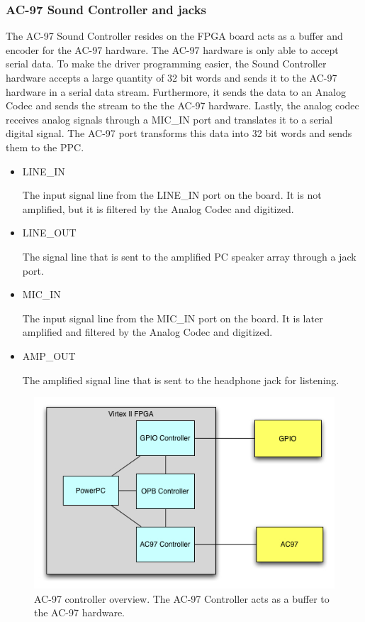 \documentclass[11pt,letter,oneside]{report}
\begin{document}
	\subsubsection{AC-97 Sound Controller and jacks}
		The AC-97 Sound Controller resides on the FPGA board acts as a buffer and encoder for the AC-97 hardware. The AC-97 hardware is only able to accept serial data. To make the driver programming easier, the Sound Controller hardware accepts a large quantity of 32 bit words and sends it to the AC-97 hardware in a serial data stream. Furthermore, it sends the data to an Analog Codec and sends the stream to the the AC-97 hardware. Lastly, the analog codec receives analog signals through a MIC\_IN port and translates it to a serial digital signal. The AC-97 port transforms this data into 32 bit words and sends them to the PPC.
		\begin{itemize}
		\item LINE\_IN

		The input signal line from the LINE\_IN port on the board. It is not amplified, but it is filtered by the Analog Codec and digitized.
		\item LINE\_OUT

		The signal line that is sent to the amplified PC speaker array through a jack port.
		\item MIC\_IN

		The input signal line from the MIC\_IN port on the board. It is later amplified and filtered by the Analog Codec and digitized.
		\item AMP\_OUT
		
		The amplified signal line that is sent to the headphone jack for listening.
		\end{itemize}
		\begin{figure}[ht]
		\centering
		\includegraphics[scale=.8]{AC97.jpg}
		\caption{AC-97 controller overview. The AC-97 Controller acts as a buffer to the AC-97 hardware.}
		\label{fig:ac97}
		\end{figure}
\end{document}
